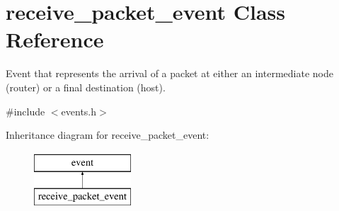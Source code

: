\hypertarget{classreceive__packet__event}{\section{receive\-\_\-packet\-\_\-event Class Reference}
\label{classreceive__packet__event}
}


Event that represents the arrival of a packet at either an intermediate node (router) or a final destination (host).  




{\ttfamily \#include $<$events.\-h$>$}

Inheritance diagram for receive\-\_\-packet\-\_\-event\-:\begin{figure}[H]
\begin{center}
\leavevmode
\includegraphics[height=2.000000cm]{classreceive__packet__event}
\end{center}
\end{figure}
